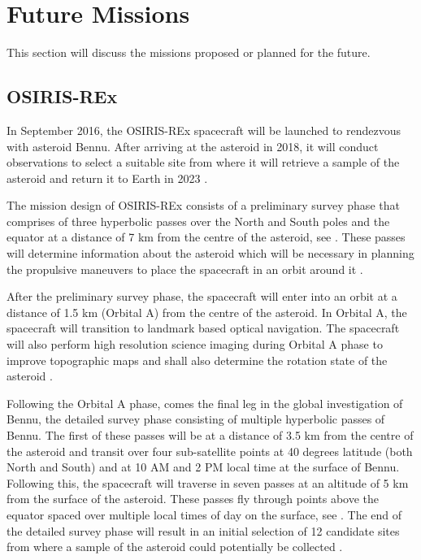 \section{Future Missions}
\label{future}
This section will discuss the missions proposed or planned for the future.

\subsection{OSIRIS-REx}
\label{osiris-rex}
In September 2016, the \gls{OSIRIS-REx} spacecraft will be launched to rendezvous with asteroid Bennu. After arriving at the asteroid in 2018, it will conduct observations to select a suitable site from where it will retrieve a sample of the asteroid and return it to Earth in 2023 \cite{osiris}.

The mission design of \gls{OSIRIS-REx} consists of a preliminary survey phase that comprises of three hyperbolic passes over the North and South poles and the equator at a distance of 7 km from the centre of the asteroid, see . These passes will determine information about the asteroid which will be necessary in planning the propulsive maneuvers to place the spacecraft in an orbit around it \cite{osiris}.

After the preliminary survey phase, the spacecraft will enter into an orbit at a distance of 1.5 km (Orbital A) from the centre of the asteroid. In Orbital A, the spacecraft will transition to landmark based optical navigation. The spacecraft will also perform high resolution science imaging during Orbital A phase to improve topographic maps and shall also determine the rotation state of the asteroid \cite{osiris}.

Following the Orbital A phase, comes the final leg in the global investigation of Bennu, the detailed survey phase consisting of multiple hyperbolic passes of Bennu. The first of these passes will be at a distance of 3.5 km from the centre of the asteroid and transit over four sub-satellite points at 40 degrees latitude (both North and South) and at 10 AM and 2 PM local time at the surface of Bennu. Following this, the spacecraft will traverse in seven passes at an altitude of 5 km from the surface of the asteroid. These passes fly through points above the equator spaced over multiple local times of day on the surface, see . The end of the detailed survey phase will result in an initial selection of 12 candidate sites from where a sample of the asteroid could potentially be collected \cite{osiris}.

